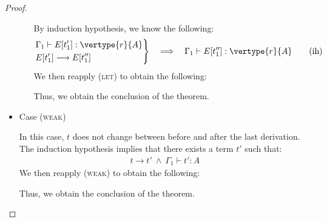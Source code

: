 \begin{proof}
\begin{itemize}
\begin{itemize}
By induction hypothesis, we know the following:
\begin{align*}
    \left.
    \begin{aligned}
        &\Gamma_1 \vdash E[t'_1] : \vertype{r}{A}\\
        &E[t'_1] \longrightarrow E[t''_1]
    \end{aligned}
    \right\}
    \hspace{1em}\Longrightarrow\hspace{1em}
    \Gamma_1 \vdash E[t''_1] : \vertype{r}{A}
    \tag{ih}
\end{align*}
We then reapply (\textsc{let}) to obtain the following:
\begin{center}
    \begin{minipage}{.70\linewidth}
    \end{minipage}
\end{center}
Thus, we obtain the conclusion of the theorem.\\
\end{itemize}


\item Case (\textsc{weak})
\begin{center}
    \begin{minipage}{.45\linewidth}
    \end{minipage}
\end{center}
In this case, $t$ does not change between before and after the last derivation.
The induction hypothesis implies that there exists a term $t'$ such that:
\begin{align*}
        t \longrightarrow t'
        \ \land\ \Gamma_1 \vdash t' : A \tag{ih}
\end{align*}
We then reapply (\textsc{weak}) to obtain the following:
\begin{center}
    \begin{minipage}{.38\linewidth}
    \end{minipage}
\end{center}
Thus, we obtain the conclusion of the theorem.
\\


\end{itemize}
\end{proof}
